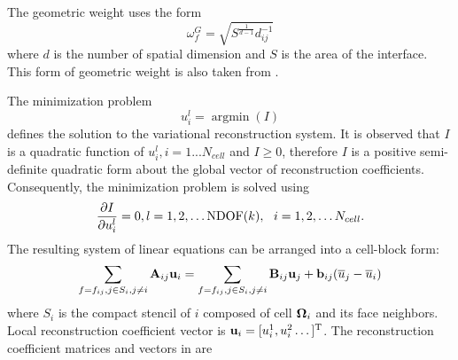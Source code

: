 The geometric weight uses the form
\begin{equation}
    \omega_f^G = \sqrt{S^{\frac{1}{d-1}}d_{ij}^{-1}}
\end{equation}
where $d$ is the number of spatial dimension and $S$ is the area of the interface.
This form of
geometric weight is also taken from \cite{huang2022high}.

The minimization problem
\begin{equation}
    u_i^l = \mathop{\arg \min}(I)
\end{equation}
defines the solution to the variational reconstruction system.
It is observed that $I$ is a quadratic function of $u_i^l, i = 1...N_{cell}$ and
$I\geq 0$,
therefore $I$ is a positive semi-definite quadratic form about the global vector of reconstruction
coefficients. Consequently, the minimization problem is solved using
\begin{equation}
    \partialderivative{I}{u_i^l} = 0, l=1,2,\dots \mathrm{NDOF}(k),\ \ i=1,2,\dots N_{cell} .
\end{equation}
The resulting system of linear equations can be arranged into a cell-block form:
\begin{equation}
    \label{eq:vrBlockEq}
    \sum_{f=f_{ij},j\in S_i, j\neq i}{ \mathbf{A}_{ij} \mathbf{u}_i}
    =
    \sum_{f=f_{ij},j\in S_i, j\neq i}{ \mathbf{B}_{ij} \mathbf{u}_j + \mathbf{b}_{ij} (\overline{u}_j - \overline{u}_i)}
\end{equation}
where $S_i$ is the compact stencil of $i$ composed of cell $\mathbf{\Omega}_{i}$ and its face neighbors.
Local reconstruction coefficient vector is $\mathbf{u}_i = [u_i^1,u_i^2\dots]^\mathrm{T}$.
The reconstruction coefficient matrices and vectors in 
are
